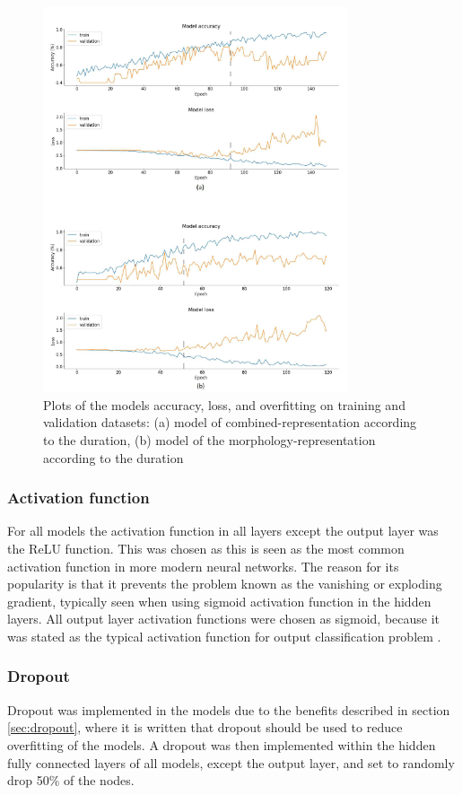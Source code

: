 
\begin{figure} [H]
\centering
\includegraphics[width=0.8\textwidth]{figures/graphs1}
\caption{Plots of the models accuracy, loss, and overfitting on training and validation datasets: (a) model of combined-representation according to the duration, (b) model of the morphology-representation according to the duration}
\label{fig:graphs1}
\end{figure}


\subsubsection{Activation function}
For all models the activation function in all layers except the output layer was the ReLU function. This was chosen as this is seen as the most common activation function in more modern neural networks. The reason for its popularity is that it prevents the problem known as the vanishing or exploding gradient, typically seen when using sigmoid activation function in the hidden layers.\citep{Goodfellow2016}   
All output layer activation functions were chosen as sigmoid, because it was stated as the typical activation function for output classification problem \citep{Duda2000}.

\subsubsection{Dropout}
Dropout was implemented in the models due to the benefits described in section \ref{sec:dropout}, where it is written that dropout should be used to reduce overfitting of the models. A dropout was then implemented within the hidden fully connected layers of all models, except the output layer, and set to randomly drop 50\% of the nodes. 


